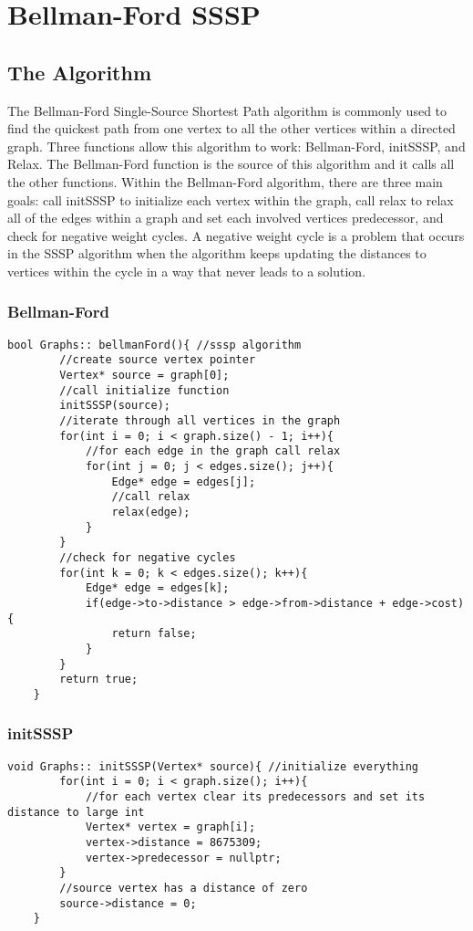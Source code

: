 \documentclass[letterpaper, 10pt,DIV=13]{scrartcl}
\numberwithin{equation}{section} %
\numberwithin{figure}{section} %
\numberwithin{table}{section} %
\begin{document}
\section{Bellman-Ford SSSP}

\subsection{The Algorithm}
The Bellman-Ford Single-Source Shortest Path algorithm is commonly used to find the quickest path from one vertex to all the other vertices within a directed graph. Three functions allow this algorithm to work: Bellman-Ford, initSSSP, and Relax. The Bellman-Ford function is the source of this algorithm and it calls all the other functions. Within the Bellman-Ford algorithm, there are three main goals: call initSSSP to initialize each vertex within the graph, call relax to relax all of the edges within a graph and set each involved vertices predecessor, and check for negative weight cycles. A negative weight cycle is a problem that occurs in the SSSP algorithm when the algorithm keeps updating the distances to vertices within the cycle in a way that never leads to a solution.

\subsubsection*{Bellman-Ford}
    \lstset{numbers=left, numberstyle=\tiny, stepnumber=1, numbersep=5pt, basicstyle=\footnotesize\ttfamily}
    \begin{lstlisting}[frame=single, ]
    bool Graphs:: bellmanFord(){ //sssp algorithm
        //create source vertex pointer
        Vertex* source = graph[0];
        //call initialize function
        initSSSP(source);
        //iterate through all vertices in the graph
        for(int i = 0; i < graph.size() - 1; i++){
            //for each edge in the graph call relax
            for(int j = 0; j < edges.size(); j++){
                Edge* edge = edges[j];
                //call relax
                relax(edge);
            }
        }
        //check for negative cycles
        for(int k = 0; k < edges.size(); k++){
            Edge* edge = edges[k];
            if(edge->to->distance > edge->from->distance + edge->cost){
                return false;
            }
        }
        return true;
    }
\end{lstlisting}

\subsubsection*{initSSSP}
    \lstset{numbers=left, numberstyle=\tiny, stepnumber=1, numbersep=5pt, basicstyle=\footnotesize\ttfamily}
    \begin{lstlisting}[frame=single, ]
    void Graphs:: initSSSP(Vertex* source){ //initialize everything
        for(int i = 0; i < graph.size(); i++){
            //for each vertex clear its predecessors and set its distance to large int
            Vertex* vertex = graph[i];
            vertex->distance = 8675309;
            vertex->predecessor = nullptr;
        }
        //source vertex has a distance of zero
        source->distance = 0;
    }
\end{lstlisting}
\end{document}
